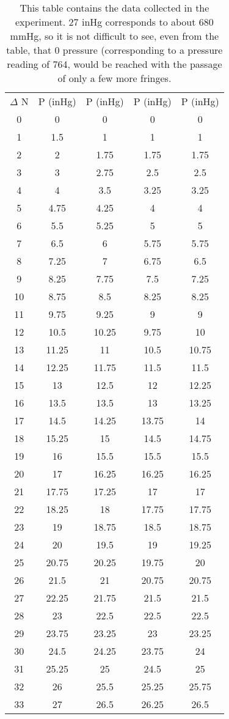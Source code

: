\documentclass[aps,pre,twocolumn,nofootinbib]{revtex4}
\begin{document}
\begin{table}[h]
	\caption{This table contains the data collected in the experiment.   27 inHg corresponds to about 680 mmHg, so it is not difficult to see, even from the table, that 0 pressure (corresponding to a pressure reading of 764, would be reached with the passage of only a few more fringes.}
\begin{ruledtabular}
	\begin{tabular}{ccccc} 
$\Delta$ N & P (inHg) & P (inHg) & P (inHg) & P (inHg)\\
0 & 0	 & 0 & 0 & 0\\
1 & 1.5 & 1 & 1 & 1\\
2 & 2	 & 1.75 & 1.75 & 1.75\\
3 & 3	 & 2.75 & 2.5 & 2.5\\
4 & 4	 & 3.5 & 3.25 & 3.25\\
5 & 4.75 & 4.25 & 4 & 4\\
6 & 5.5 & 5.25 & 5 & 5\\
7 & 6.5 & 6 & 5.75 & 5.75\\
8 & 7.25 & 7 & 6.75 & 6.5\\
9 & 8.25 & 7.75 & 7.5 & 7.25\\
10 & 8.75 & 8.5	 & 8.25 & 8.25\\
11 & 9.75 & 9.25 & 9 & 9\\
12 & 10.5 & 10.25 & 9.75 & 10\\
13 & 11.25 & 11 & 10.5 & 10.75\\
14 & 12.25 & 11.75 & 11.5 & 11.5\\
15 & 13 & 12.5 & 12 & 12.25\\
16 & 13.5 & 13.5 & 13 & 13.25\\
17 & 14.5 & 14.25 & 13.75 & 14\\
18 & 15.25 & 15 & 14.5 & 14.75\\
19 & 16 & 15.5 & 15.5 & 15.5\\
20 & 17 & 16.25 & 16.25 & 16.25\\
21 & 17.75 & 17.25 & 17 & 17\\
22 & 18.25 & 18 & 17.75 & 17.75\\
23 & 19 & 18.75 & 18.5 & 18.75\\
24 & 20 & 19.5 & 19 & 19.25\\
25 & 20.75 & 20.25 & 19.75 & 20\\
26 & 21.5 & 21 & 20.75 & 20.75\\
27 & 22.25 & 21.75 & 21.5 & 21.5\\
28 & 23 & 22.5 & 22.5 & 22.5\\
29 & 23.75 & 23.25 & 23 & 23.25\\
30 & 24.5 & 24.25 & 23.75 & 24\\
31 & 25.25 & 25 & 24.5 & 25\\
32 & 26 & 25.5 & 25.25 & 25.75\\
33 & 27 & 26.5 & 26.25 & 26.5\\
	\end{tabular}
	\end{ruledtabular}
	\label{data}
\end{table}
\end{document}
